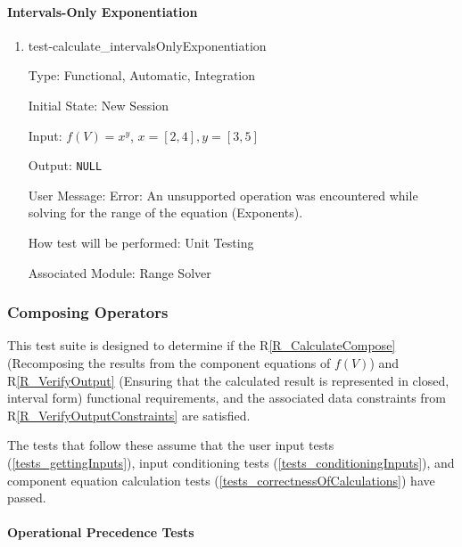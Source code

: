 \documentclass[12pt, titlepage]{article}
\newcommand{\rref}[1]{R\ref{#1}}
\begin{document}
\paragraph{Intervals-Only Exponentiation}

\begin{enumerate}
	
	\item{test-calculate\_intervalsOnlyExponentiation}
	
	Type: Functional, Automatic, Integration
	
	Initial State: New Session
	
	Input: $f(V) = x^y$, $x = [2,4], y = [3,5]$
	
	Output: \texttt{NULL}
	
	User Message: Error: An unsupported operation was encountered while solving 
	for the range of the equation (Exponents).
	
	How test will be performed: Unit Testing
	
	Associated Module: Range Solver\\
	
\end{enumerate}

\subsubsection{Composing Operators}
\label{tests_operatorComposition}
This test suite is designed to determine if the
\rref{R_CalculateCompose} (Recomposing the results from the component equations 
of $f(V)$) and \rref{R_VerifyOutput} (Ensuring that the calculated result is
represented in closed, interval form) functional requirements, and the
associated data constraints from \rref{R_VerifyOutputConstraints} are
satisfied.


The tests that follow these assume that the user input tests 
(\ref{tests_gettingInputs}), input conditioning tests 
(\ref{tests_conditioningInputs}), and component equation calculation tests 
(\ref{tests_correctnessOfCalculations}) have passed.

\paragraph{Operational Precedence Tests}
\end{document}
